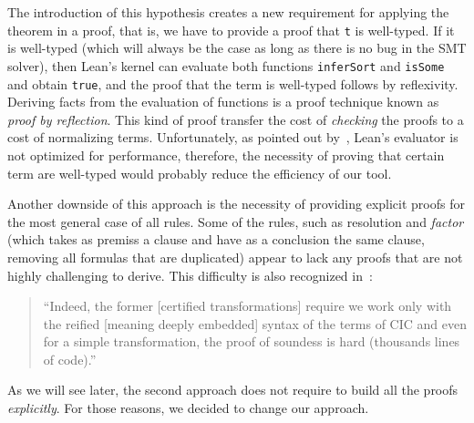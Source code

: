 The introduction of this hypothesis creates a new requirement for applying
the theorem in a proof, that is, we have to provide a proof that \texttt{t} is well-typed.
If it is well-typed (which will always be the case as long
as there is no bug in the SMT solver), then Lean's kernel can evaluate
both functions \texttt{inferSort} and \texttt{isSome} and obtain \texttt{true},
and the proof that the term is well-typed follows by reflexivity. Deriving facts
from the evaluation of functions is a proof technique known as \textit{proof by reflection}.
This kind of proof transfer the cost of \textit{checking} the proofs to a cost of
normalizing terms. Unfortunately, as pointed out by~\cite{ringLean}, Lean's evaluator
is not optimized for performance, therefore, the necessity of proving that certain term are
well-typed would probably reduce the efficiency of our tool.

Another downside of this approach is the necessity of providing explicit proofs for the most
general case of all rules. Some of the rules, such as resolution and
\textit{factor} (which takes as premiss a clause and have as a conclusion the same clause, removing
all formulas that are duplicated) appear to lack any proofs that are not highly challenging to derive.
This difficulty is also recognized in~\cite[6]{snipe}:
\begin{quote}
  ``Indeed, the former [certified transformations] require we work only with the reified [meaning deeply embedded] syntax of the
  terms of CIC and even for a simple transformation, the proof of soundess is hard (thousands lines of code).''
\end{quote}

As we will see later, the second approach does not require to build all the proofs \textit{explicitly}.
For those reasons, we decided to change our approach.



